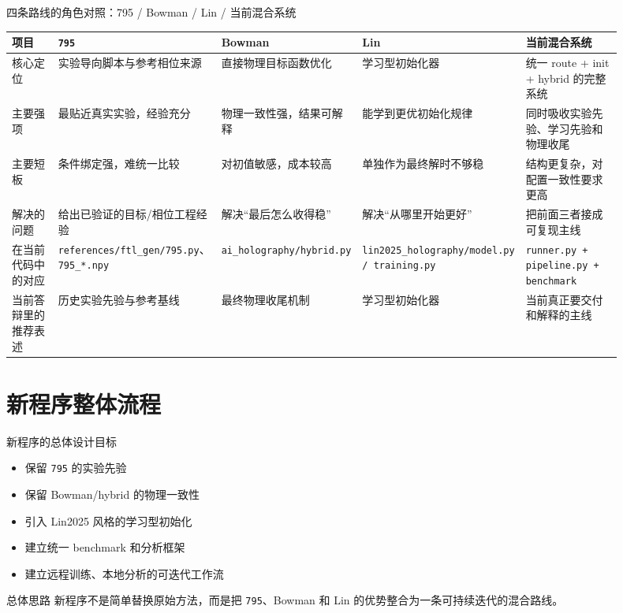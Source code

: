 \documentclass[aspectratio=169,10pt]{ctexbeamer}
\begin{document}
\begin{frame}{四条路线的角色对照：795 / Bowman / Lin / 当前混合系统}
  \scriptsize
  \begin{tabular}{>{\raggedright\arraybackslash}p{0.14\linewidth} >{\raggedright\arraybackslash}p{0.18\linewidth} >{\raggedright\arraybackslash}p{0.18\linewidth} >{\raggedright\arraybackslash}p{0.18\linewidth} >{\raggedright\arraybackslash}p{0.22\linewidth}}
    \toprule
    项目 & \texttt{795} & Bowman & Lin & 当前混合系统 \\
    \midrule
    核心定位 & 实验导向脚本与参考相位来源 & 直接物理目标函数优化 & 学习型初始化器 & 统一 route + init + hybrid 的完整系统 \\
    主要强项 & 最贴近真实实验，经验充分 & 物理一致性强，结果可解释 & 能学到更优初始化规律 & 同时吸收实验先验、学习先验和物理收尾 \\
    主要短板 & 条件绑定强，难统一比较 & 对初值敏感，成本较高 & 单独作为最终解时不够稳 & 结构更复杂，对配置一致性要求更高 \\
    解决的问题 & 给出已验证的目标/相位工程经验 & 解决“最后怎么收得稳” & 解决“从哪里开始更好” & 把前面三者接成可复现主线 \\
    在当前代码中的对应 & \texttt{references/ftl\_gen/795.py}、\texttt{795\_*.npy} & \texttt{ai\_holography/hybrid.py} & \texttt{lin2025\_holography/model.py / training.py} & \texttt{runner.py + pipeline.py + benchmark} \\
    当前答辩里的推荐表述 & 历史实验先验与参考基线 & 最终物理收尾机制 & 学习型初始化器 & 当前真正要交付和解释的主线 \\
    \bottomrule
  \end{tabular}
\end{frame}

\section{新程序整体流程}

\begin{frame}{新程序的总体设计目标}
  \begin{itemize}
    \item 保留 \texttt{795} 的实验先验
    \item 保留 Bowman/hybrid 的物理一致性
    \item 引入 Lin2025 风格的学习型初始化
    \item 建立统一 benchmark 和分析框架
    \item 建立远程训练、本地分析的可迭代工作流
  \end{itemize}

  \vspace{0.4em}
  \begin{block}{总体思路}
    新程序不是简单替换原始方法，而是把 \texttt{795}、Bowman 和 Lin 的优势整合为一条可持续迭代的混合路线。
  \end{block}
\end{frame}
\end{document}
